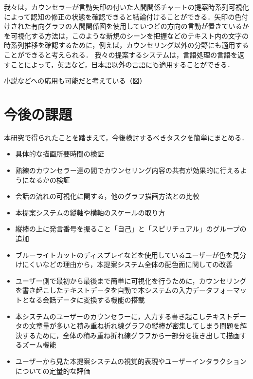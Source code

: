 \documentclass[shuuron]{kuee}
\begin{document}

我々は，カウンセラーが言動矢印の付いた人間関係チャートの提案時系列可視化によって認知の修正の状態を確認できると結論付けることができる．矢印の色付けされた有向グラフの人間関係図を使用していつどの方向の言動が置きているかを可視化する方法は，このような新規のシーンを把握などのテキスト内の文字の時系列推移を確認するために，例えば，カウンセリング以外の分野にも適用することができると考えられる．
我々の提案するシステムは，言語処理の言語を返すことによって，英語など，日本語以外の言語にも適用することができる．

小説などへの応用も可能だと考えている（図）

\section{今後の課題}

本研究で得られたことを踏まえて，今後検討するべきタスクを簡単にまとめる．

\begin{itemize}
  \item 具体的な描画所要時間の検証
  \item 熟練のカウンセラー達の間でカウンセリング内容の共有が効果的に行えるようになるかの検証
  \item 会話の流れの可視化に関する，他のグラフ描画方法との比較
  \item 本提案システムの縦軸や横軸のスケールの取り方
  \item 縦棒の上に発言番号を振ること「自己」と「スピリチュアル」のグループの追加
  \item ブルーライトカットのディスプレイなどを使用しているユーザーが色を見分けにくいなどの理由から，本提案システム全体の配色面に関しての改善
  \item ユーザー側で最初から最後まで簡単に可視化を行うために，カウンセリングを書き起こしたテキストデータを自動で本システムの入力データフォーマットとなる会話データに変換する機能の搭載
  \item 本システムのユーザーのカウンセラーに，入力する書き起こしテキストデータの文章量が多いと積み重ね折れ線グラフの縦棒が密集してしまう問題を解決するために，全体の積み重ね折れ線グラフから一部分を抜き出して描画するズーム機能
  \item ユーザーから見た本提案システムの視覚的表現やユーザーインタラクションについての定量的な評価
\end{itemize}
\end{document}

